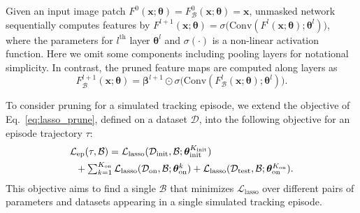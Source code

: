 \documentclass[letterpaper]{article} %
\def \x{\mathbf{x}}
\def \datainit{\mathcal{D}_\text{init}}
\def \dataonline{\mathcal{D}_\text{on}}
\def \dataval{\mathcal{D}_\text{test}}
\def \thetageneral{\boldsymbol{\theta}}
\def \thetainitadapt{\boldsymbol{\theta}_\text{init}}
\def \thetaonlineadapt{\boldsymbol{\theta}_\text{on}}
\def \Kinit{K_\text{init}}
\def \Konline{K_\text{on}}
\def \losslasso{\mathcal{L}_\text{lasso}}
\def \lossepisode{\mathcal{L}_\text{ep}}
\begin{document}
Given an input image patch $F^0(\x;\thetageneral)=F^0_{\mathcal{B}}(\x;\thetageneral) = \x$, unmasked network sequentially computes features by $F^{l+1}(\x; \boldsymbol{\theta})=\sigma\big(\text{Conv}(F^{l}(\x; \boldsymbol{\theta}); \boldsymbol{\theta}^l ) \big)$, where the parameters for $l^\text{th}$ layer $\boldsymbol{\theta}^l$ and $\sigma(\cdot)$ is a non-linear activation function.
Here we omit some components including pooling layers for notational simplicity.
In contrast, the pruned feature maps are computed along layers as
\begin{equation}
F^{l+1}_\mathcal{B}(\x ; \boldsymbol{\theta}) = \boldsymbol{\beta}^{l+1} \odot \sigma\big( \text{Conv} (F^l_\mathcal{B}(\x ; \boldsymbol{\theta}); \boldsymbol{\theta}^l)  \big).
\end{equation}




To consider pruning for a simulated tracking episode, we extend the objective of Eq.~\eqref{eq:lasso_prune}, defined on a dataset $\mathcal{D}$, into the following objective for an episode trajectory $\tau$:
\begin{equation}
\begin{split}
& \textstyle \lossepisode(\tau, \mathcal{B})
	 = \losslasso(\datainit, \mathcal{B}; \thetainitadapt^{\Kinit}) \\
& \textstyle \hspace{0.2cm}
	+ \sum_{k=1}^{\Konline}\losslasso(\dataonline, \mathcal{B};\thetaonlineadapt^k)
	+ \losslasso(\dataval, \mathcal{B};\thetaonlineadapt^{\Konline}).
\label{eq:lasso_prune_episode}
\end{split}
\end{equation}
This objective aims to find a single $\mathcal{B}$ that minimizes $\losslasso$ over different pairs of parameters and datasets appearing in a single simulated tracking episode.
\end{document}
